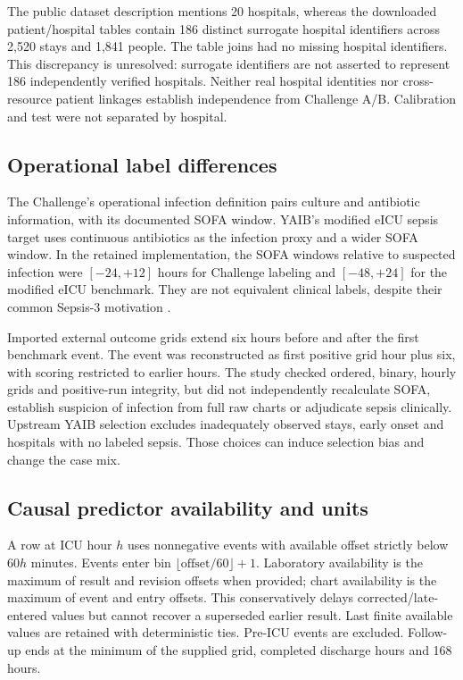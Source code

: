 \documentclass[11pt,a4paper]{article}
\begin{document}
The public dataset description mentions 20 hospitals, whereas the downloaded patient/hospital tables contain 186 distinct surrogate hospital identifiers across 2,520 stays and 1,841 people. The table joins had no missing hospital identifiers. This discrepancy is unresolved: surrogate identifiers are not asserted to represent 186 independently verified hospitals. Neither real hospital identities nor cross-resource patient linkages establish independence from Challenge A/B. Calibration and test were not separated by hospital.

\subsection{Operational label differences}
The Challenge's operational infection definition pairs culture and antibiotic information, with its documented SOFA window. YAIB's modified eICU sepsis target uses continuous antibiotics as the infection proxy and a wider SOFA window. In the retained implementation, the SOFA windows relative to suspected infection were $[-24,+12]$ hours for Challenge labeling and $[-48,+24]$ for the modified eICU benchmark. They are not equivalent clinical labels, despite their common Sepsis-3 motivation \cite{singer,reyna,yaib}.

Imported external outcome grids extend six hours before and after the first benchmark event. The event was reconstructed as first positive grid hour plus six, with scoring restricted to earlier hours. The study checked ordered, binary, hourly grids and positive-run integrity, but did not independently recalculate SOFA, establish suspicion of infection from full raw charts or adjudicate sepsis clinically. Upstream YAIB selection excludes inadequately observed stays, early onset and hospitals with no labeled sepsis. Those choices can induce selection bias and change the case mix.

\subsection{Causal predictor availability and units}
A row at ICU hour $h$ uses nonnegative events with available offset strictly below $60h$ minutes. Events enter bin $\lfloor\mathrm{offset}/60\rfloor+1$. Laboratory availability is the maximum of result and revision offsets when provided; chart availability is the maximum of event and entry offsets. This conservatively delays corrected/late-entered values but cannot recover a superseded earlier result. Last finite available values are retained with deterministic ties. Pre-ICU events are excluded. Follow-up ends at the minimum of the supplied grid, completed discharge hours and 168 hours.
\end{document}
